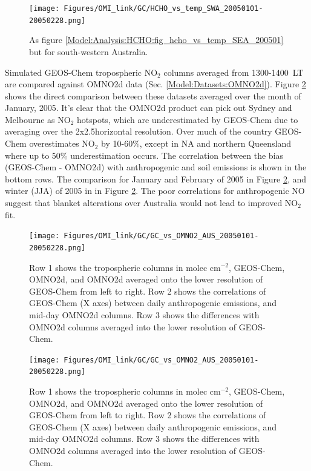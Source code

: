     \begin{figure}
      \texttt{[image: Figures/OMI\_link/GC/HCHO\_vs\_temp\_SWA\_20050101-20050228.png]}
      \caption{%
        As figure \ref{Model:Analysis:HCHO:fig_hcho_vs_temp_SEA_200501} but for south-western Australia.
      }
      \label{Model:Analysis:HCHO:fig_hcho_vs_temp_SWA_200501}
    \end{figure}
    
    
    Simulated GEOS-Chem tropospheric NO$_2$ columns averaged from 1300-1400~LT are compared against OMNO2d data (Sec. \ref{Model:Datasets:OMNO2d}). 
    Figure \ref{Model:Analysis:NOx:fig_GC_vs_OMNO2d_summer_2005} shows the direct comparison between these datasets averaged over the month of January, 2005.
    It's clear that the OMNO2d product can pick out Sydney and Melbourne as NO$_2$ hotspots, which are underestimated by GEOS-Chem due to averaging over the 2x2.5\degr horizontal resolution.
    Over much of the country GEOS-Chem overestimates NO$_2$ by 10-60\%, except in NA and northern Queensland where up to 50\% underestimation occurs.
    The correlation between the bias (GEOS-Chem - OMNO2d) with anthropogenic and soil emissions is shown in the bottom rows.
    The comparison for January and February of 2005 in Figure \ref{Model:Analysis:NOx:fig_GC_vs_OMNO2d_summer_2005}, and winter (JJA) of 2005 in in Figure \ref{Model:Analysis:NOx:fig_GC_vs_OMNO2d_summer_2005}.
    The poor correlations for anthropogenic NO suggest that blanket alterations over Australia would not lead to improved NO$_2$ fit. 
    
    \begin{figure}
      \texttt{[image: Figures/OMI\_link/GC/GC\_vs\_OMNO2\_AUS\_20050101-20050228.png]}
      \caption{%
        Row 1 shows the tropospheric columns in molec cm$^{-2}$, GEOS-Chem, OMNO2d, and OMNO2d averaged onto the lower resolution of GEOS-Chem from left to right.
        Row 2 shows the correlations of GEOS-Chem (X axes) between daily anthropogenic emissions, and mid-day OMNO2d columns.
        Row 3 shows the differences with OMNO2d columns averaged into the lower resolution of GEOS-Chem.
      }
      \label{Model:Analysis:NOx:fig_GC_vs_OMNO2d_summer_2005}
    \end{figure}
    
    \begin{figure}
      \texttt{[image: Figures/OMI\_link/GC/GC\_vs\_OMNO2\_AUS\_20050101-20050228.png]}
      \caption{%
        Row 1 shows the tropospheric columns in molec cm$^{-2}$, GEOS-Chem, OMNO2d, and OMNO2d averaged onto the lower resolution of GEOS-Chem from left to right.
        Row 2 shows the correlations of GEOS-Chem (X axes) between daily anthropogenic emissions, and mid-day OMNO2d columns.
        Row 3 shows the differences with OMNO2d columns averaged into the lower resolution of GEOS-Chem.
      }
      \label{Model:Analysis:NOx:fig_GC_vs_OMNO2d_winter_2005}
    \end{figure}
    
